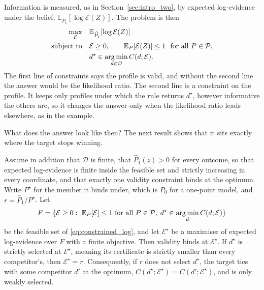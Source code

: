 Information is measured, as in Section~\ref{sec:intro_two}, by expected
log-evidence under the belief, $\mathbb E_{\widehat P_1}[\log\mathcal E(Z)]$.
The problem is then
\begin{equation}
 \begin{aligned}
 \max_{\mathcal E}\quad &\mathbb E_{\widehat P_1}[\log\mathcal E(Z)]\\
 \text{subject to}\quad
 &\mathcal E\geq0,\qquad
 \mathbb E_{P}[\mathcal E(Z)]\leq1\ \ \text{for all }P\in\mathcal P,\\
 &d^\star\in\operatorname*{arg\,min}_{d\in\mathcal D}C(d;\mathcal E).
 \end{aligned}
 \label{eq:constrained_log}
\end{equation}
The first line of constraints says the profile is valid, and without the
second line the answer would be the likelihood ratio. The second line is a
constraint on the profile. It keeps only profiles under which the rule
returns $d^\star$, however informative the others are, so it changes the
answer only when the likelihood ratio leads elsewhere, as in the example.

What does the answer look like then? The next result shows that it sits
exactly where the target stops winning.

\begin{proposition}\label{prop:boundary}
Assume in addition that $\mathcal D$ is finite, that $\widehat P_1(z)>0$ for
every outcome, so that expected log-evidence is finite inside the feasible set
and strictly increasing in every coordinate, and that exactly one validity
constraint binds at the optimum. Write $P^\star$ for the member it binds
under, which is $P_0$ for a one-point model, and $r=\widehat P_1/P^\star$.
Let
\[
 F=\{\mathcal E\geq0:\ \mathbb E_{P}[\mathcal E]\leq1\ \text{for all }P\in\mathcal P,\;
 d^\star\in\operatorname*{arg\,min}_d C(d;\mathcal E)\}
\]
be the feasible set of \eqref{eq:constrained_log}, and let $\mathcal E^\star$
be a maximiser of expected log-evidence over $F$ with a finite objective. Then
validity binds at $\mathcal E^\star$. If $d^\star$ is strictly selected at
$\mathcal E^\star$, meaning its certificate is strictly smaller than every
competitor's, then $\mathcal E^\star=r$. Consequently, if $r$ does not select
$d^\star$, the target ties with some competitor $d'$ at the optimum,
$C(d^\star;\mathcal E^\star)=C(d';\mathcal E^\star)$, and is only weakly
selected.
\end{proposition}

